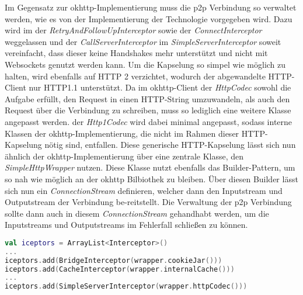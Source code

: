         Im Gegensatz zur okhttp-Implementierung muss die p2p Verbindung so verwaltet werden, wie es von der Implementierung der Technologie vorgegeben wird. Dazu wird im  der {\it RetryAndFollowUpInterceptor} sowie der {\it ConnectInterceptor} weggelassen und der {\it CallServerInterceptor} im {\it SimpleServerInterceptor} soweit vereinfacht, dass dieser keine Handshakes mehr unterstützt und nicht mit Websockets genutzt werden kann. Um die Kapselung so simpel wie möglich zu halten, wird ebenfalls auf HTTP 2 verzichtet, wodurch der abgewandelte HTTP-Client nur HTTP1.1 unterstützt. Da im okhttp-Client der {\it HttpCodec} sowohl die Aufgabe erfüllt, den Request in einen HTTP-String umzuwandeln, als auch den Request über die Verbindung zu schreiben, muss so lediglich eine weitere Klasse angepasst werden. der {\it Http1Codec} wird dabei minimal angepasst, sodass interne Klassen der okhttp-Implementierung, die nicht im Rahmen dieser HTTP-Kapselung nötig sind, entfallen. Diese generische HTTP-Kapselung lässt sich nun ähnlich der okhttp-Implementierung über eine zentrale Klasse, den {\it SimpleHttpWrapper} nutzen. Diese Klasse nutzt ebenfalls das Builder-Pattern, um so nah wie möglich an der okhttp Bilbiothek zu bleiben. Über diesen Builder lässt sich nun ein {\it ConnectionStream} definieren, welcher dann den Inputstream und Outputstream der Verbindung be-reitstellt. Die Verwaltung der p2p Verbindung sollte dann auch in diesem {\it ConnectionStream} gehandhabt werden, um die Inputstreams und Outputstreams im Fehlerfall schließen zu können.

        \begin{lstlisting}[frame=bt, label={lst:android:okhttpchanges}, language=Kotlin, caption=Änderungen an okhttp (Clientcode in Kotlin)]
val iceptors = ArrayList<Interceptor>()
...
iceptors.add(BridgeInterceptor(wrapper.cookieJar()))
iceptors.add(CacheInterceptor(wrapper.internalCache()))
...
iceptors.add(SimpleServerInterceptor(wrapper.httpCodec()))
        \end{lstlisting}        
        
